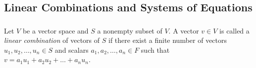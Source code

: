 
\subsection{Linear Combinations and Systems of Equations}

\subsubsection*{}

\begin{definition}
		Let \(V\) be a vector space and \(S\) a nonempty subset of \(V\). A vector \(v \in V\) is called a \textit{linear combination} of vectors of \(S\) if there exist a finite number of vectors \(u_{1},u_{2},\dots,u_{n}\in S\) and scalars \(a_{1},a_{2},\dots,a_{n}\in F\) such that \(v = a_{1}u_{1}+a_{2}u_{2}+\dots+a_{n}u_{n}\).

\end{definition}


